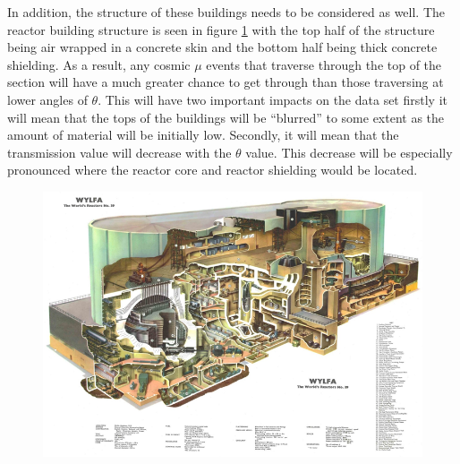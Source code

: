 

In addition, the structure of these buildings needs to be considered as well. The reactor building structure is seen in figure \ref{fig:wylfaReactorRoughStructure} with the top half of the structure being air wrapped in a concrete skin and the bottom half being thick concrete shielding. As a result, any cosmic $\mu$ events that traverse through the top of the section will have a much greater chance to get through than those traversing at lower angles of $\theta$. This will have two important impacts on the data set firstly it will mean that the tops of the buildings will be ``blurred'' to some extent as the amount of material will be initially low. Secondly, it will mean that the transmission value will decrease with the $\theta$ value. This decrease will be especially pronounced where the reactor core and reactor shielding would be located. 

\begin{figure}[!h]
 \centering
 \includegraphics[width=0.6\linewidth]{Chapter5/Figs/wylfaRasterNew/wylfaReactorRoughStructure.png}
 \label{fig:wylfaReactorRoughStructure}
\end{figure}

